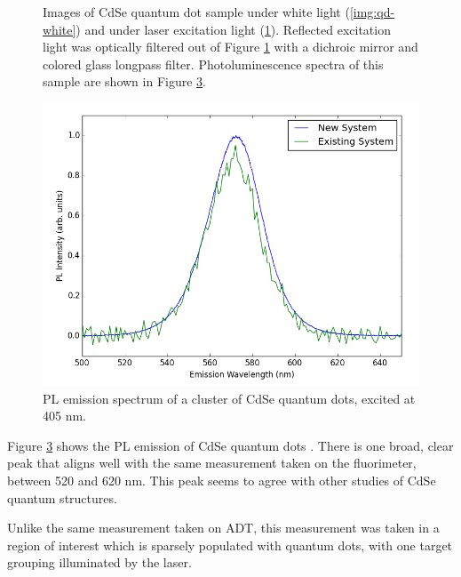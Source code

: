 \begin{figure}[H]
\begin{subfigure}[b]{0.45\textwidth}
        \caption{}
        \label{img:qd-laser}
    \end{subfigure}
    \caption[Images of CdSe quantum dot sample.]{Images of CdSe quantum dot sample under white light (\ref{img:qd-white}) and under laser excitation light (\ref{img:qd-laser}). Reflected excitation light was optically filtered out of Figure \ref{img:qd-laser} with a dichroic mirror and colored glass longpass filter. Photoluminescence spectra of this sample are shown in Figure \ref{fig:pl-adt-qd}.}
    \label{img:qd}
\end{figure}

\begin{figure}[H]
    \centering
    \includegraphics[width=\textwidth]{./img/qd-2.png}
    \caption{PL emission spectrum of a cluster of CdSe quantum dots, excited at 405 nm.}
    \label{fig:pl-adt-qd}
\end{figure}

Figure \ref{fig:pl-adt-qd} shows the PL emission of CdSe quantum dots . There is one broad, clear peak that aligns well with the same measurement taken on the fluorimeter, between 520 and 620 nm. This peak seems to agree with other studies of CdSe quantum structures.\cite{empedocles_photoluminescence_1996}

Unlike the same measurement taken on ADT, this measurement was taken in a region of interest which is sparsely populated with quantum dots, with one target grouping illuminated by the laser.

